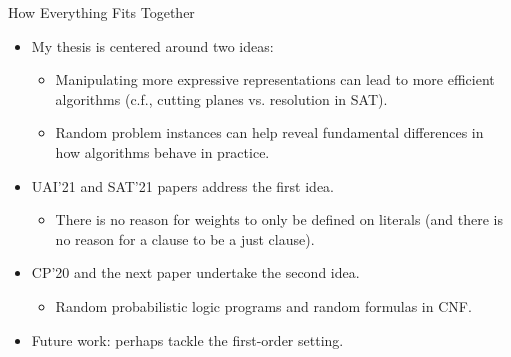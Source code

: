 \documentclass{beamer}
\begin{document}
\begin{frame}{How Everything Fits Together}
  \begin{itemize}
  \item My thesis is centered around two ideas:
    \begin{itemize}
    \item Manipulating more expressive representations can lead to more
      efficient algorithms (c.f., cutting planes vs. resolution in SAT).
    \item Random problem instances can help reveal fundamental differences in
      how algorithms behave in practice.
    \end{itemize}
  \item UAI'21 and SAT'21 papers address the first idea.
    \begin{itemize}
    \item There is no reason for weights to only be defined on literals (and
      there is no reason for a clause to be a just clause).
    \end{itemize}
  \item CP'20 and the next paper undertake the second idea.
    \begin{itemize}
    \item Random probabilistic logic programs and random formulas in CNF.
    \end{itemize}
  \item Future work: perhaps tackle the first-order setting.
  \end{itemize}
\end{frame}
\end{document}
